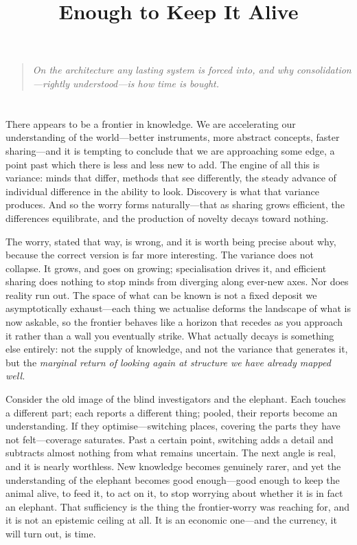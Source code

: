 \documentclass{article}
\title{Enough to Keep It Alive}
\author{}
\date{}
\begin{document}
\maketitle

\begin{quote}
\textit{On the architecture any lasting system is forced into, and why consolidation---rightly understood---is how time is bought.}
\end{quote}

\section*{}

There appears to be a frontier in knowledge. We are accelerating our understanding of the world---better instruments, more abstract concepts, faster sharing---and it is tempting to conclude that we are approaching some edge, a point past which there is less and less new to add. The engine of all this is variance: minds that differ, methods that see differently, the steady advance of individual difference in the ability to look. Discovery is what that variance produces. And so the worry forms naturally---that as sharing grows efficient, the differences equilibrate, and the production of novelty decays toward nothing.

The worry, stated that way, is wrong, and it is worth being precise about why, because the correct version is far more interesting. The variance does not collapse. It grows, and goes on growing; specialisation drives it, and efficient sharing does nothing to stop minds from diverging along ever-new axes. Nor does reality run out. The space of what can be known is not a fixed deposit we asymptotically exhaust---each thing we actualise deforms the landscape of what is now askable, so the frontier behaves like a horizon that recedes as you approach it rather than a wall you eventually strike. What actually decays is something else entirely: not the supply of knowledge, and not the variance that generates it, but the \textit{marginal return of looking again at structure we have already mapped well.}

Consider the old image of the blind investigators and the elephant. Each touches a different part; each reports a different thing; pooled, their reports become an understanding. If they optimise---switching places, covering the parts they have not felt---coverage saturates. Past a certain point, switching adds a detail and subtracts almost nothing from what remains uncertain. The next angle is real, and it is nearly worthless. New knowledge becomes genuinely rarer, and yet the understanding of the elephant becomes good enough---good enough to keep the animal alive, to feed it, to act on it, to stop worrying about whether it is in fact an elephant. That sufficiency is the thing the frontier-worry was reaching for, and it is not an epistemic ceiling at all. It is an economic one---and the currency, it will turn out, is time.
\end{document}
